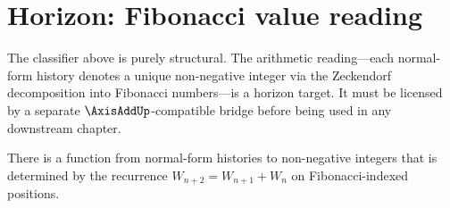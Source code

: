 \section{Horizon: Fibonacci value reading}

The classifier above is purely structural. The arithmetic reading---each normal-form history denotes a unique non-negative integer via the Zeckendorf decomposition into Fibonacci numbers---is a horizon target. It must be licensed by a separate \(\AxisAddUp\)-compatible bridge before being used in any downstream chapter.

\begin{theorem}
\label{thm:znormal-fibonacci-value-horizon}
There is a function from normal-form histories to non-negative integers that is determined by the recurrence \(W_{n+2} = W_{n+1} + W_n\) on Fibonacci-indexed positions.
\end{theorem}

